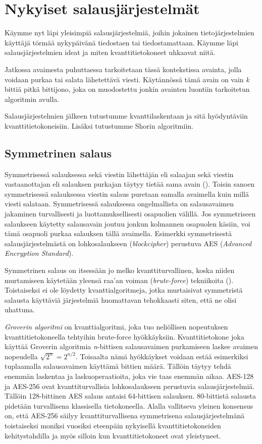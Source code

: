 \chapter{Nykyiset salausjärjestelmät\label{methods}}

Käymme nyt läpi yleisimpiä salausjärjestelmiä, joihin jokainen tietojärjestelmien käyttäjä törmää nykypäivänä tiedostaen tai tiedostamattaan. Käymme läpi salausjärjestelmien ideat ja miten kvanttitietokoneet uhkaavat niitä.

Jatkossa avaimesta puhuttaessa tarkoitetaan tässä kontekstissa avainta, jolla voidaan purkaa tai salata lähetettävä viesti. Käytännössä tämä avain on vain \emph{k} bittiä pitkä bittijono, joka on muodostettu jonkin avainten luontiin tarkoitetun algoritmin avulla.

Salausjärjestelmien jälkeen tutustumme kvanttilaskentaan ja sitä hyödyntäviin kvanttitietokoneisiin. Lisäksi tutustumme Shorin algoritmiin.

\section{Symmetrinen salaus}
 Symmetrisessä salauksessa sekä viestin lähettäjän eli salaajan sekä viestin vastaanottajan eli salauksen purkajan täytyy tietää sama avain (\cite{bellare2005introduction}). Toisin sanoen symmetrisessä salauksessa viestin salaus puretaan samalla avaimella kuin millä viesti salataan.  Symmetrisessä salauksessa ongelmallista on salausavaimen jakaminen turvallisesti ja luottamuksellisesti osapuolien välillä. Jos symmetriseen salaukseen käytetty salausavain joutuu jonkun kolmannen osapuolen käsiin, voi tämä osapuoli purkaa salauksen tällä avaimella. Esimerkki symmetrisestä salausjärjestelmästä on lohkosalaukseen (\emph{blockcipher}) perustuva AES (\emph{Advanced Encryption Standard}).
 
 Symmetrinen salaus on itsessään jo melko kvanttiturvallinen, koska niiden murtamiseen käytetään yleensä raa'an voiman (\emph{brute-force}) tekniikoita (\cite{mavroeidis2018impact}). Toistaiseksi ei ole löydetty kvanttialgoritmeja, jotka murtaisivat symmetristä salausta käyttäviä järjestelmiä huomattavan tehokkaasti siten, että ne olisi uhattuna. 
 
 \emph{Groverin algoritmi} on kvanttialgoritmi, joka tuo neliöllisen nopeutuksen kvanttitietokoneella tehtyihin brute-force hyökkäyksiin. Kvanttitietokone joka käyttää Groverin algoritmia \emph{n}-bittisen salausavaimen purkamiseen laskee avaimen nopeudella $\sqrt{2^{n}} = 2^{n/2}$. Toisaalta nämä hyökkäykset voidaan estää esimerkiksi tuplaamalla salausavaimen käyttämä bittien määrä. Tällöin täytyy tehdä enemmän laskentaa ja laskuoperaatioita, joka vie taas enemmän aikaa. AES-128 ja AES-256 ovat kvanttiturvallisia lohkosalaukseen perustuvia salausjärjestelmiä. Tällöin 128-bittinen AES salaus antaisi 64-bittisen salauksen. 80-bittistä salausta pidetään turvallisena klassisella tietokoneella. Alalla vallitseva yleinen konsensus on, että AES-256 säilyy kvanttiturvallisena symmetrisena salausjärjestelmänä toistaiseksi moniksi vuosiksi eteenpäin nykyisellä kvanttitietokoneiden kehitystahdilla ja myös silloin kun kvanttitietokoneet ovat yleistyneet.
 
